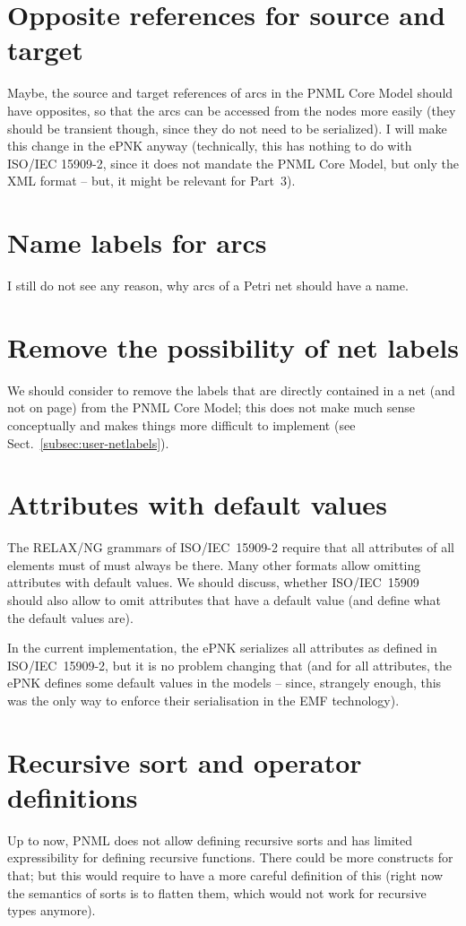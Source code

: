 \section{Opposite references for source and target}
Maybe, the source and target references of arcs in the
PNML Core Model should have opposites, so that the arcs can
be accessed from the  nodes more easily (they should be transient
though, since they do not need to be serialized). I will
make this change in the ePNK anyway (technically, this
has nothing to do with ISO/IEC 15909-2, since it does not
mandate the PNML Core Model, but only the XML format -- but,
it might be relevant for Part~3).   

\section{Name labels for arcs}   
I still do not see any reason, why arcs of a Petri net should
have a name.

\section{Remove the possibility of net labels}   
We should consider to remove the labels that are directly contained
in a net (and not on page) from the PNML Core Model; this does
not make much sense conceptually and makes things more difficult
to implement (see Sect.~\ref{subsec:user-netlabels}).

\section{Attributes with default values}    
The RELAX/NG grammars of ISO/IEC~15909-2 require that all attributes of
all elements must of must always be there. Many other formats allow omitting
attributes with default values. We should discuss, whether ISO/IEC~15909 should
also allow to omit attributes that have a default value (and define what the
default values are). 

In the current implementation, the ePNK serializes all attributes as defined
in ISO/IEC~15909-2, but it is no problem changing that (and for all attributes,
the ePNK defines some default values in the models -- since, strangely enough,
this was the only way to enforce their serialisation in the EMF technology).

\section{Recursive sort and operator definitions}
Up to now, PNML does not allow defining recursive sorts and has
limited expressibility for defining recursive functions. There
could be more constructs for that; but this would require to
have a more careful definition of this (right now the semantics
of sorts is to flatten them, which would not work for recursive
types anymore).

